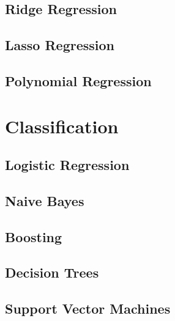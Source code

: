 \documentclass[18pt,a3paper,landscape, ncols=2]{cheatsheet}
\begin{document}
	\subsection{Ridge Regression}
		\begin{mdframed}
		\end{mdframed}
	\subsection{Lasso Regression}
		\begin{mdframed}
		\end{mdframed}
	\subsection{Polynomial Regression}
		\begin{mdframed}
		\end{mdframed}

\section{Classification} \seperator
	\subsection{Logistic Regression}
		\begin{mdframed}
		\end{mdframed}
	\subsection{Naive Bayes}
		\begin{mdframed}
		\end{mdframed}
	\subsection{Boosting}
		\begin{mdframed}
		\end{mdframed}
	\subsection{Decision Trees}
		\begin{mdframed}
		\end{mdframed}
	\subsection{Support Vector Machines}
		\begin{mdframed}
		\end{mdframed}
	
\end{document}
